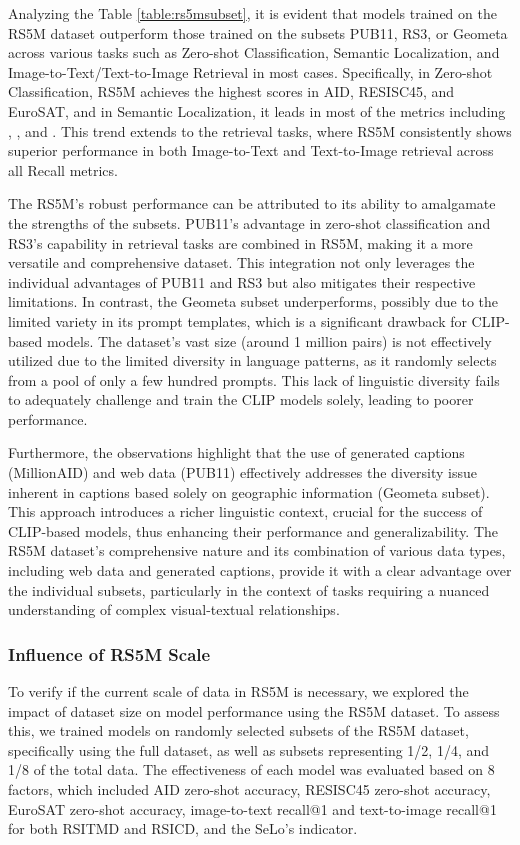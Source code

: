 \documentclass[journal]{IEEEtran}
\begin{document}
Analyzing the Table \ref{table:rs5msubset}, it is evident that models trained on the RS5M dataset outperform those trained on the subsets PUB11, RS3, or Geometa across various tasks such as Zero-shot Classification, Semantic Localization, and Image-to-Text/Text-to-Image Retrieval in most cases. Specifically, in Zero-shot Classification, RS5M achieves the highest scores in AID, RESISC45, and EuroSAT, and in Semantic Localization, it leads in most of the metrics including , , and . This trend extends to the retrieval tasks, where RS5M consistently shows superior performance in both Image-to-Text and Text-to-Image retrieval across all Recall metrics.

The RS5M's robust performance can be attributed to its ability to amalgamate the strengths of the subsets. PUB11's advantage in zero-shot classification and RS3's capability in retrieval tasks are combined in RS5M, making it a more versatile and comprehensive dataset. This integration not only leverages the individual advantages of PUB11 and RS3 but also mitigates their respective limitations. In contrast, the Geometa subset underperforms, possibly due to the limited variety in its prompt templates, which is a significant drawback for CLIP-based models. The dataset's vast size (around 1 million pairs) is not effectively utilized due to the limited diversity in language patterns, as it randomly selects from a pool of only a few hundred prompts. This lack of linguistic diversity fails to adequately challenge and train the CLIP models solely, leading to poorer performance.

Furthermore, the observations highlight that the use of generated captions (MillionAID) and web data (PUB11) effectively addresses the diversity issue inherent in captions based solely on geographic information (Geometa subset). This approach introduces a richer linguistic context, crucial for the success of CLIP-based models, thus enhancing their performance and generalizability. The RS5M dataset's comprehensive nature and its combination of various data types, including web data and generated captions, provide it with a clear advantage over the individual subsets, particularly in the context of tasks requiring a nuanced understanding of complex visual-textual relationships.

\subsubsection{Influence of RS5M Scale}

To verify if the current scale of data in RS5M is necessary, we explored the impact of dataset size on model performance using the RS5M dataset. To assess this, we trained models on randomly selected subsets of the RS5M dataset, specifically using the full dataset, as well as subsets representing 1/2, 1/4, and 1/8 of the total data. The effectiveness of each model was evaluated based on 8 factors, which included AID zero-shot accuracy, RESISC45 zero-shot accuracy, EuroSAT zero-shot accuracy, image-to-text recall@1 and text-to-image recall@1 for both RSITMD and RSICD, and the SeLo's  indicator.
\end{document}
